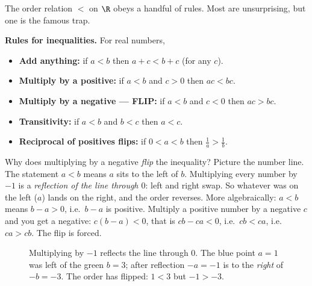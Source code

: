 The order relation $<$ on $\R$ obeys a handful of rules. Most are unsurprising, but
one is the famous trap.

\begin{focusbox}
\textbf{Rules for inequalities.} For real numbers,
\begin{itemize}
  \item \textbf{Add anything:} if $a < b$ then $a + c < b + c$ (for any $c$).
  \item \textbf{Multiply by a positive:} if $a<b$ and $c>0$ then $ac < bc$.
  \item \textbf{Multiply by a negative --- FLIP:} if $a<b$ and $c<0$ then
        $ac > bc$.
  \item \textbf{Transitivity:} if $a<b$ and $b<c$ then $a<c$.
  \item \textbf{Reciprocal of positives flips:} if $0<a<b$ then
        $\tfrac1a > \tfrac1b$.
\end{itemize}
\end{focusbox}

\begin{whybox}
Why does multiplying by a negative \emph{flip} the inequality? Picture the number
line. The statement $a<b$ means $a$ sits to the left of $b$. Multiplying every
number by $-1$ is a \emph{reflection of the line through $0$}: left and right swap.
So whatever was on the left ($a$) lands on the right, and the order reverses. More
algebraically: $a<b$ means $b-a>0$, i.e.\ $b-a$ is positive. Multiply a positive
number by a negative $c$ and you get a negative: $c(b-a)<0$, that is $cb-ca<0$,
i.e.\ $cb<ca$, i.e.\ $ca>cb$. The flip is forced.
\end{whybox}

\begin{figure}[H]
\centering
{}
\caption{Multiplying by $-1$ reflects the line through $0$. The blue point $a=1$
was left of the green $b=3$; after reflection $-a=-1$ is to the \emph{right} of
$-b=-3$. The order has flipped: $1<3$ but $-1>-3$.}
\label{ch40:fig-flip}
\end{figure}

